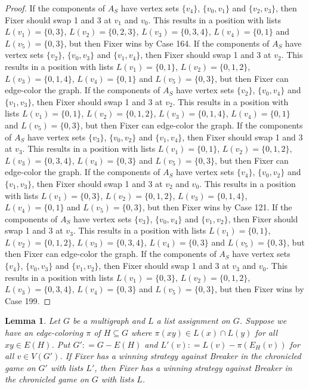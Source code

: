 \documentclass[12pt]{amsart}
\theoremstyle{plain}
\newtheorem{lem}[thm]{Lemma}
\theoremstyle{definition}
\theoremstyle{remark}
\newcommand{\DefinedAs}{\mathrel{\mathop:}=}
\begin{document}
\begin{proof}
If the components of $A_S$ have vertex sets $\{v_4\}$, $\{v_0, v_1\}$ and $\{v_2, v_3\}$, then Fixer should swap 1 and 3 at $v_1$ and $v_0$. This results in a position with lists $L(v_1) = \{0, 3\}$, $L(v_2) = \{0, 2, 3\}$, $L(v_3) = \{0, 3, 4\}$, $L(v_4) = \{0, 1\}$ and $L(v_5) = \{0, 3\}$, but then Fixer wins by Case 164.
If the components of $A_S$ have vertex sets $\{v_2\}$, $\{v_0, v_3\}$ and $\{v_1, v_4\}$, then Fixer should swap 1 and 3 at $v_2$. This results in a position with lists $L(v_1) = \{0, 1\}$, $L(v_2) = \{0, 1, 2\}$, $L(v_3) = \{0, 1, 4\}$, $L(v_4) = \{0, 1\}$ and $L(v_5) = \{0, 3\}$, but then Fixer can edge-color the graph.
If the components of $A_S$ have vertex sets $\{v_2\}$, $\{v_0, v_4\}$ and $\{v_1, v_3\}$, then Fixer should swap 1 and 3 at $v_2$. This results in a position with lists $L(v_1) = \{0, 1\}$, $L(v_2) = \{0, 1, 2\}$, $L(v_3) = \{0, 1, 4\}$, $L(v_4) = \{0, 1\}$ and $L(v_5) = \{0, 3\}$, but then Fixer can edge-color the graph.
If the components of $A_S$ have vertex sets $\{v_3\}$, $\{v_0, v_2\}$ and $\{v_1, v_4\}$, then Fixer should swap 1 and 3 at $v_3$. This results in a position with lists $L(v_1) = \{0, 1\}$, $L(v_2) = \{0, 1, 2\}$, $L(v_3) = \{0, 3, 4\}$, $L(v_4) = \{0, 3\}$ and $L(v_5) = \{0, 3\}$, but then Fixer can edge-color the graph.
If the components of $A_S$ have vertex sets $\{v_4\}$, $\{v_0, v_2\}$ and $\{v_1, v_3\}$, then Fixer should swap 1 and 3 at $v_2$ and $v_0$. This results in a position with lists $L(v_1) = \{0, 3\}$, $L(v_2) = \{0, 1, 2\}$, $L(v_3) = \{0, 1, 4\}$, $L(v_4) = \{0, 1\}$ and $L(v_5) = \{0, 3\}$, but then Fixer wins by Case 121.
If the components of $A_S$ have vertex sets $\{v_3\}$, $\{v_0, v_4\}$ and $\{v_1, v_2\}$, then Fixer should swap 1 and 3 at $v_3$. This results in a position with lists $L(v_1) = \{0, 1\}$, $L(v_2) = \{0, 1, 2\}$, $L(v_3) = \{0, 3, 4\}$, $L(v_4) = \{0, 3\}$ and $L(v_5) = \{0, 3\}$, but then Fixer can edge-color the graph.
If the components of $A_S$ have vertex sets $\{v_4\}$, $\{v_0, v_3\}$ and $\{v_1, v_2\}$, then Fixer should swap 1 and 3 at $v_3$ and $v_0$. This results in a position with lists $L(v_1) = \{0, 3\}$, $L(v_2) = \{0, 1, 2\}$, $L(v_3) = \{0, 3, 4\}$, $L(v_4) = \{0, 3\}$ and $L(v_5) = \{0, 3\}$, but then Fixer wins by Case 199.

\end{proof}


\begin{lem}\label{CanColorAndPlayOnRest}
Let $G$ be a multigraph and $L$ a list assignment on $G$.  Suppose we have an edge-coloring $\pi$ of $H \subseteq G$ where $\pi(xy) \in L(x) \cap L(y)$ for all $xy \in E(H)$.  Put $G' \DefinedAs G - E(H)$ and 
$L'(v) \DefinedAs L(v) - \pi(E_H(v))$ for all $v \in V(G')$.  If Fixer has a winning strategy against Breaker in the chronicled game on $G'$ with lists $L'$, then Fixer has a winning strategy against Breaker in the chronicled game on $G$ with lists $L$.
\end{lem}
\end{document}
